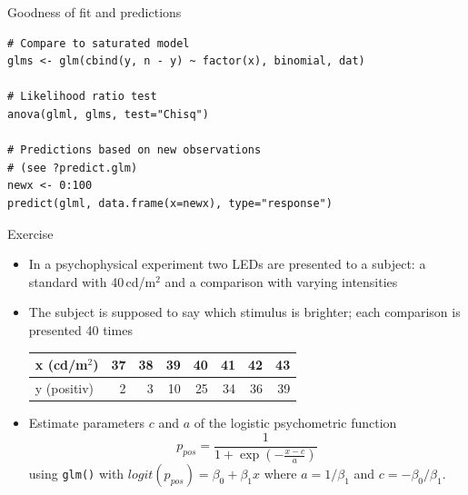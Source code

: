 \documentclass[aspectratio=169]{beamer}
\begin{document}
\begin{frame}[fragile]{Goodness of fit and predictions}
\begin{lstlisting}
# Compare to saturated model
glms <- glm(cbind(y, n - y) ~ factor(x), binomial, dat)

# Likelihood ratio test
anova(glml, glms, test="Chisq")

# Predictions based on new observations
# (see ?predict.glm)
newx <- 0:100
predict(glml, data.frame(x=newx), type="response")
\end{lstlisting}
\end{frame}

\begin{frame}[fragile]{}
  \begin{block}{Exercise}
    \begin{itemize}
\item In a psychophysical experiment two LEDs are presented to a
  subject: a standard with 40\,cd/m$^2$ and a comparison with varying
        intensities
    \item The subject is supposed to say which stimulus is
      brighter; each comparison is presented 40 times
        \vspace{.2cm}
\begin{center}
\begin{tabular}{l|rrrrrrr}
x (cd/m$^2$)  & 37 & 38 & 39 & 40 & 41 & 42 & 43 \\ \hline
y (positiv)   &  2 &  3 & 10 & 25 & 34 & 36 & 39
\end{tabular}
\end{center}
        \vspace{.2cm}
\item Estimate parameters $c$ and $a$ of the logistic psychometric function
\[
  p_{pos} = \frac{1}{1 +
    \exp(-\frac{\displaystyle x - c}{\displaystyle a})}
\]
using \texttt{glm()} with $logit(p_{pos}) = \beta_0 + \beta_1x$ where
        $a = 1/\beta_1$ and $c = -\beta_0/\beta_1$.
    \end{itemize}
  \end{block}
\end{frame}

\end{document}
